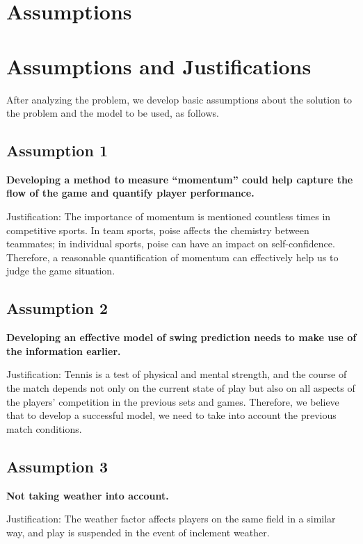 \section{Assumptions}
\section{Assumptions and Justifications}
After analyzing the problem, we develop basic assumptions about the solution to the problem and the model to be used, as follows.

\subsection{Assumption 1}

\textbf{Developing a method to measure “momentum” could help capture the flow of the game and quantify player performance.}
\par
Justification: The importance of momentum is mentioned countless times in competitive sports. In team sports, poise affects the chemistry between teammates; in individual sports, poise can have an impact on self-confidence. Therefore, a reasonable quantification of momentum can effectively help us to judge the game situation.

\subsection{Assumption 2}
\textbf{Developing an effective model of swing prediction needs to make use of the information earlier.}
\par
Justification: Tennis is a test of physical and mental strength, and the course of the match depends not only on the current state of play but also on all aspects of the players' competition in the previous sets and games. Therefore, we believe that to develop a successful model, we need to take into account the previous match conditions.

\subsection{Assumption 3}
\textbf{Not taking weather into account.}
\par
Justification: The weather factor affects players on the same field in a similar way, and play is suspended in the event of inclement weather.